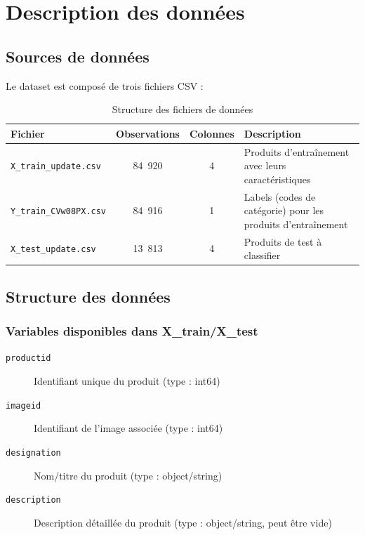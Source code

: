 \documentclass[12pt,a4paper]{article}
\begin{document}
\section{Description des données}

\subsection{Sources de données}

Le dataset est composé de trois fichiers CSV :

\begin{table}[H]
\centering
\begin{tabular}{@{}p{5cm}ccp{8cm}@{}}
\toprule
\textbf{Fichier} & \textbf{Observations} & \textbf{Colonnes} & \textbf{Description} \\
\midrule
\texttt{X\_train\_update.csv} & 84~920 & 4 & Produits d'entraînement avec leurs caractéristiques \\
\texttt{Y\_train\_CVw08PX.csv} & 84~916 & 1 & Labels (codes de catégorie) pour les produits d'entraînement \\
\texttt{X\_test\_update.csv} & 13~813 & 4 & Produits de test à classifier \\
\bottomrule
\end{tabular}
\caption{Structure des fichiers de données}
\label{tab:structure_fichiers}
\end{table}

\subsection{Structure des données}

\subsubsection{Variables disponibles dans X\_train/X\_test}

\begin{description}
    \item[\texttt{productid}] Identifiant unique du produit (type : int64)
    \item[\texttt{imageid}] Identifiant de l'image associée (type : int64)
    \item[\texttt{designation}] Nom/titre du produit (type : object/string)
    \item[\texttt{description}] Description détaillée du produit (type : object/string, peut être vide)
\end{description}
\end{document}
